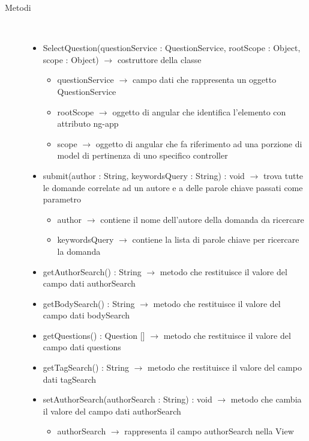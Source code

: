 \begin{description}
\item[Metodi] \hfill \\
\vspace{-7mm}
\begin{itemize}
	\item SelectQuestion(questionService : QuestionService, rootScope : Object, scope : Object) $\rightarrow$ costruttore della classe\begin{itemize}
		\item questionService $\rightarrow$ campo dati che rappresenta un oggetto QuestionService
		\item rootScope $\rightarrow$ oggetto di angular che identifica l’elemento con attributo ng-app
		\item scope $\rightarrow$ oggetto di angular che fa riferimento ad una porzione di model di pertinenza di uno specifico controller
	\end{itemize}
	
	\item submit(author : String, keywordsQuery : String) : void $\rightarrow$ trova tutte le domande correlate ad un autore e a delle parole chiave passati come parametro\begin{itemize}
		\item author $\rightarrow$ contiene il nome dell'autore della domanda da ricercare 
		\item keywordsQuery $\rightarrow$ contiene la lista di parole chiave per ricercare la domanda
	\end{itemize}
	
	\item getAuthorSearch() : String $\rightarrow$ metodo che restituisce il valore del campo dati authorSearch
	\item getBodySearch() : String $\rightarrow$ metodo che restituisce il valore del campo dati bodySearch
	\item getQuestions() : Question [] $\rightarrow$ metodo che restituisce il valore del campo dati questions
	\item getTagSearch() : String $\rightarrow$ metodo che restituisce il valore del campo dati tagSearch
	\item setAuthorSearch(authorSearch : String) : void $\rightarrow$ metodo che cambia il valore del campo dati authorSearch\begin{itemize}
		\item authorSearch $\rightarrow$ rappresenta il campo authorSearch nella View
	\end{itemize}
	

\end{itemize}
\end{description}
